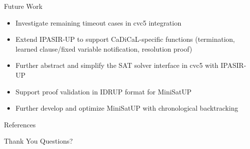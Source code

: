 \documentclass{beamer}
\begin{document}
\begin{frame}{Future Work}
  \begin{itemize}
    \item Investigate remaining timeout cases in cvc5 integration
    \item Extend IPASIR-UP to support CaDiCaL-specific functions (termination, learned clause/fixed variable notification, resolution proof)
    \item Further abstract and simplify the SAT solver interface in cvc5 with IPASIR-UP
    \item Support proof validation in IDRUP format for MiniSatUP
    \item Further develop and optimize MiniSatUP with chronological backtracking
  \end{itemize}
\end{frame}


\begin{frame}[t,allowframebreaks]{References}
  \scriptsize
  \nocite{*}
  
  
\end{frame}

\begin{frame}{Thank You}
  Questions?
\end{frame}
\end{document}
